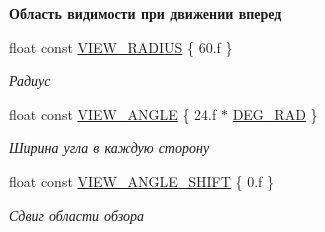 \begin{Indent}\textbf{ Область видимости при движении вперед}\par
\begin{DoxyCompactItemize}
\item 
\mbox{\label{namespacertm_a6ae2631935a995c34abce1c62fa3dcd7}} 
float const \hyperlink{namespacertm_a6ae2631935a995c34abce1c62fa3dcd7}{V\+I\+E\+W\+\_\+\+R\+A\+D\+I\+US} \{ 60.f \}
\begin{DoxyCompactList}\small\item\em Радиус \end{DoxyCompactList}\item 
\mbox{\label{namespacertm_af0ecac808d3938e77a20990f1947c8fd}} 
float const \hyperlink{namespacertm_af0ecac808d3938e77a20990f1947c8fd}{V\+I\+E\+W\+\_\+\+A\+N\+G\+LE} \{ 24.f $\ast$ \hyperlink{namespacertm_a797faf3037681ed7bc153db9eca6155e}{D\+E\+G\+\_\+\+R\+AD} \}
\begin{DoxyCompactList}\small\item\em Ширина угла в каждую сторону \end{DoxyCompactList}\item 
\mbox{\label{namespacertm_a10eed490bb183c7853ac317d82e0b1cd}} 
float const \hyperlink{namespacertm_a10eed490bb183c7853ac317d82e0b1cd}{V\+I\+E\+W\+\_\+\+A\+N\+G\+L\+E\+\_\+\+S\+H\+I\+FT} \{ 0.f \}
\begin{DoxyCompactList}\small\item\em Сдвиг области обзора \end{DoxyCompactList}\end{DoxyCompactItemize}
\end{Indent}
